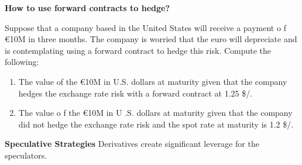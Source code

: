 \documentclass[11pt,fleqn]{book} %
\numberwithin{equation}{section} %
\numberwithin{figure}{section} %
\numberwithin{table}{section} %
\begin{document}
\begin{exercise}\textbf{How to use forward contracts to hedge?}

Suppose that a company based in the United States will receive a payment o f €10M in
three months. The company is worried that the euro will depreciate and is contemplating
using a forward contract to hedge this risk. Compute the following:
\begin{enumerate}
    \item The value of the €10M in U.S. dollars at maturity given that the company hedges the
exchange rate risk with a forward contract at 1.25 \$/\EUR{}.
    \item The value o f the €10M in U .S. dollars at maturity given that the company did not
hedge the exchange rate risk and the spot rate at maturity is 1.2 \$/\EUR{}.
\end{enumerate}
\end{exercise}

\begin{remark}\textbf{Speculative Strategies}
Derivatives create significant leverage for the speculators.
\end{remark}

\end{document}
